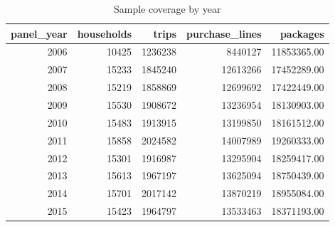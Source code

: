 \begin{table}
\caption{Sample coverage by year}
\begin{tabular}{rrrrr}
\toprule
panel\_year & households & trips & purchase\_lines & packages \\
\midrule
2006 & 10425 & 1236238 & 8440127 & 11853365.00 \\
2007 & 15233 & 1845240 & 12613266 & 17452289.00 \\
2008 & 15219 & 1858869 & 12699692 & 17422449.00 \\
2009 & 15530 & 1908672 & 13236954 & 18130903.00 \\
2010 & 15483 & 1913915 & 13199850 & 18161512.00 \\
2011 & 15858 & 2024582 & 14007989 & 19260333.00 \\
2012 & 15301 & 1916987 & 13295904 & 18259417.00 \\
2013 & 15613 & 1967197 & 13625094 & 18750439.00 \\
2014 & 15701 & 2017142 & 13870219 & 18955084.00 \\
2015 & 15423 & 1964797 & 13533463 & 18371193.00 \\
\bottomrule
\end{tabular}
\end{table}
